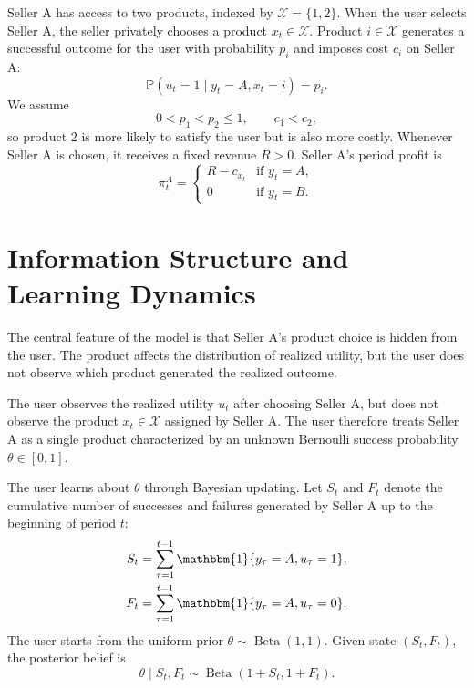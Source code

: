 \documentclass[opre]{informs3}
\newcommand{\Pb}{\mathbb{P}}
\newcommand{\Ind}[1]{\mathbbm{1}\{#1\}}
\newcommand{\Xscr}{\mathcal{X}}
\begin{document}
Seller A has access to two products, indexed by
$\Xscr=\{1,2\}$. When the user selects Seller A, the seller privately chooses a
product $x_t\in\Xscr$. Product $i\in\Xscr$ generates a successful outcome for the
user with probability $p_i$ and imposes cost $c_i$ on Seller A:
\begin{equation}
    \Pb(u_t=1\mid y_t=A,x_t=i)=p_i.
    \label{eq:seller-a-success}
\end{equation}
We assume
\begin{equation}
    0<p_1<p_2\leq 1,\qquad c_1<c_2,
    \label{eq:product-ordering}
\end{equation}
so product 2 is more likely to satisfy the user but is also more costly. Whenever
Seller A is chosen, it receives a fixed revenue $R>0$. Seller A's period profit is
\begin{equation}
    \pi_t^A=
    \begin{cases}
        R-c_{x_t} & \text{if } y_t=A,\\
        0 & \text{if } y_t=B.
    \end{cases}
    \label{eq:period-profit}
\end{equation}

\section{Information Structure and Learning Dynamics}

The central feature of the model is that Seller A's product choice is hidden from
the user. The product affects the distribution of realized utility, but the user
does not observe which product generated the realized outcome.

\begin{assumption}
The user observes the realized utility $u_t$ after choosing Seller A, but does
not observe the product $x_t\in\Xscr$ assigned by Seller A. The user therefore
treats Seller A as a single product characterized by an unknown Bernoulli success
probability $\theta\in[0,1]$.
\end{assumption}

The user learns about $\theta$ through Bayesian updating. Let $S_t$ and $F_t$
denote the cumulative number of successes and failures generated by Seller A up
to the beginning of period $t$:
\begin{align}
    S_t &= \sum_{\tau=1}^{t-1}\Ind{y_\tau=A,u_\tau=1},\\
    F_t &= \sum_{\tau=1}^{t-1}\Ind{y_\tau=A,u_\tau=0}.
\end{align}
The user starts from the uniform prior $\theta\sim\operatorname{Beta}(1,1)$.
Given state $(S_t,F_t)$, the posterior belief is
\begin{equation}
    \theta\mid S_t,F_t\sim\operatorname{Beta}(1+S_t,1+F_t).
    \label{eq:posterior}
\end{equation}
\end{document}
